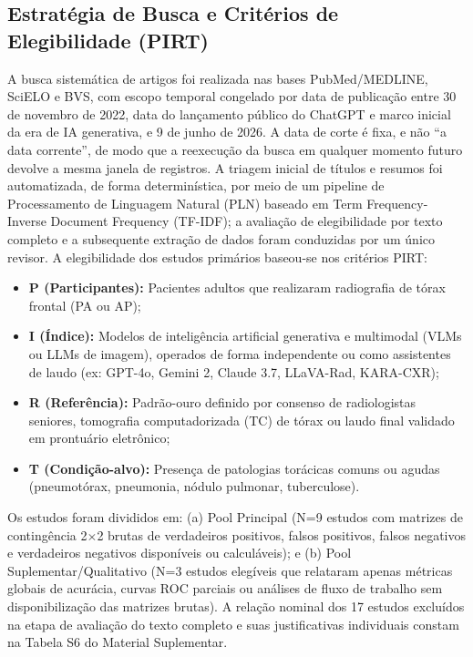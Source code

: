 \documentclass[12pt,a4paper]{article}
\begin{document}
\subsection{Estratégia de Busca e Critérios de Elegibilidade (PIRT)}
A busca sistemática de artigos foi realizada nas bases PubMed/MEDLINE, SciELO e BVS, com escopo temporal congelado por data de publicação entre 30 de novembro de 2022, data do lançamento público do ChatGPT e marco inicial da era de IA generativa, e 9 de junho de 2026. A data de corte é fixa, e não ``a data corrente'', de modo que a reexecução da busca em qualquer momento futuro devolve a mesma janela de registros. A triagem inicial de títulos e resumos foi automatizada, de forma determinística, por meio de um pipeline de Processamento de Linguagem Natural (PLN) baseado em Term Frequency-Inverse Document Frequency (TF-IDF); a avaliação de elegibilidade por texto completo e a subsequente extração de dados foram conduzidas por um único revisor. A elegibilidade dos estudos primários baseou-se nos critérios PIRT:
\begin{itemize}
    \item \textbf{P (Participantes):} Pacientes adultos que realizaram radiografia de tórax frontal (PA ou AP);
    \item \textbf{I (Índice):} Modelos de inteligência artificial generativa e multimodal (VLMs ou LLMs de imagem), operados de forma independente ou como assistentes de laudo (ex: GPT-4o, Gemini 2, Claude 3.7, LLaVA-Rad, KARA-CXR);
    \item \textbf{R (Referência):} Padrão-ouro definido por consenso de radiologistas seniores, tomografia computadorizada (TC) de tórax ou laudo final validado em prontuário eletrônico;
    \item \textbf{T (Condição-alvo):} Presença de patologias torácicas comuns ou agudas (pneumotórax, pneumonia, nódulo pulmonar, tuberculose).
\end{itemize}

Os estudos foram divididos em: (a) Pool Principal (N=9 estudos com matrizes de contingência 2$\times$2 brutas de verdadeiros positivos, falsos positivos, falsos negativos e verdadeiros negativos disponíveis ou calculáveis); e (b) Pool Suplementar/Qualitativo (N=3 estudos elegíveis que relataram apenas métricas globais de acurácia, curvas ROC parciais ou análises de fluxo de trabalho sem disponibilização das matrizes brutas). A relação nominal dos 17 estudos excluídos na etapa de avaliação do texto completo e suas justificativas individuais constam na Tabela S6 do Material Suplementar.
\end{document}
